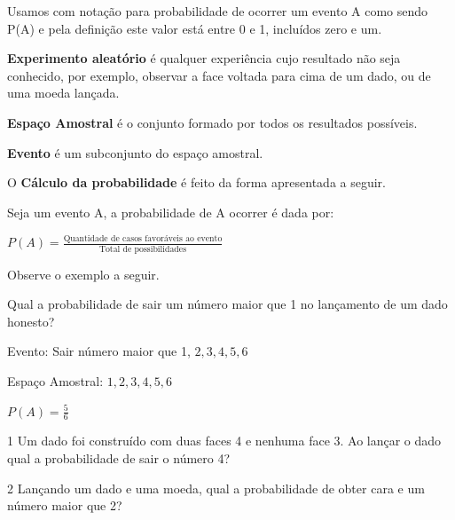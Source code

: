 {{{\begin{escolha}
{{{{{\begin{escolha}
\begin{escolha}
{\begin{q°}
{\begin{enumerate}
{{{Usamos com notação para probabilidade de ocorrer um evento A como sendo
P(A) e pela definição este valor está entre 0 e 1, incluídos zero e um.

\textbf{Experimento aleatório} é qualquer experiência cujo resultado não
seja conhecido, por exemplo, observar a face voltada para cima de um
dado, ou de uma moeda lançada. 

\textbf{Espaço Amostral} é o conjunto formado por todos os resultados possíveis.

\textbf{Evento} é um subconjunto do espaço amostral.

O \textbf{Cálculo da probabilidade} é feito da forma apresentada a seguir.

Seja um evento A, a probabilidade de A ocorrer é dada por:

$P(A)=\frac{\text{Quantidade de casos favoráveis ao evento}}{\text{Total de possibilidades}}$

Observe o exemplo a seguir.

Qual a probabilidade de sair um número maior que 1 no lançamento de um dado honesto?

Evento: Sair número maior que 1, ${2, 3, 4, 5, 6}$

Espaço Amostral: ${1, 2, 3, 4, 5, 6}$

$P(A) = \frac{5}{6}$
}


\num{1} Um dado foi construído com duas faces 4 e nenhuma face 3. Ao lançar o
dado qual a probabilidade de sair o número 4?


\num{2} Lançando um dado e uma moeda, qual a probabilidade de obter cara e um
número maior que 2?


}}
\end{enumerate}}
\end{q°}}
\end{escolha}
\end{escolha}}}}}}
\end{escolha}}}}
